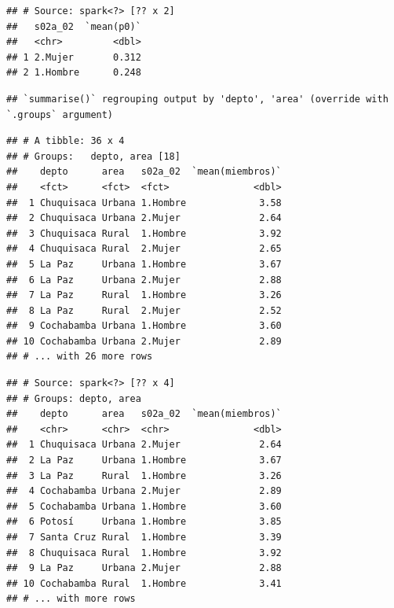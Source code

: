 \documentclass[
]{article}
\newenvironment{Shaded}{\begin{snugshade}}{\end{snugshade}}
\newcommand{\CommentTok}[1]{\textcolor[rgb]{0.56,0.35,0.01}{\textit{#1}}}
\newcommand{\DecValTok}[1]{\textcolor[rgb]{0.00,0.00,0.81}{#1}}
\newcommand{\KeywordTok}[1]{\textcolor[rgb]{0.13,0.29,0.53}{\textbf{#1}}}
\newcommand{\NormalTok}[1]{#1}
\newcommand{\OperatorTok}[1]{\textcolor[rgb]{0.81,0.36,0.00}{\textbf{#1}}}
\newcommand{\StringTok}[1]{\textcolor[rgb]{0.31,0.60,0.02}{#1}}
\begin{document}
\begin{verbatim}
## # Source: spark<?> [?? x 2]
##   s02a_02  `mean(p0)`
##   <chr>         <dbl>
## 1 2.Mujer       0.312
## 2 1.Hombre      0.248
\end{verbatim}

\begin{Shaded}
\end{Shaded}

\begin{verbatim}
## `summarise()` regrouping output by 'depto', 'area' (override with `.groups` argument)
\end{verbatim}

\begin{verbatim}
## # A tibble: 36 x 4
## # Groups:   depto, area [18]
##    depto      area   s02a_02  `mean(miembros)`
##    <fct>      <fct>  <fct>               <dbl>
##  1 Chuquisaca Urbana 1.Hombre             3.58
##  2 Chuquisaca Urbana 2.Mujer              2.64
##  3 Chuquisaca Rural  1.Hombre             3.92
##  4 Chuquisaca Rural  2.Mujer              2.65
##  5 La Paz     Urbana 1.Hombre             3.67
##  6 La Paz     Urbana 2.Mujer              2.88
##  7 La Paz     Rural  1.Hombre             3.26
##  8 La Paz     Rural  2.Mujer              2.52
##  9 Cochabamba Urbana 1.Hombre             3.60
## 10 Cochabamba Urbana 2.Mujer              2.89
## # ... with 26 more rows
\end{verbatim}

\begin{Shaded}
\end{Shaded}

\begin{verbatim}
## # Source: spark<?> [?? x 4]
## # Groups: depto, area
##    depto      area   s02a_02  `mean(miembros)`
##    <chr>      <chr>  <chr>               <dbl>
##  1 Chuquisaca Urbana 2.Mujer              2.64
##  2 La Paz     Urbana 1.Hombre             3.67
##  3 La Paz     Rural  1.Hombre             3.26
##  4 Cochabamba Urbana 2.Mujer              2.89
##  5 Cochabamba Urbana 1.Hombre             3.60
##  6 Potosí     Urbana 1.Hombre             3.85
##  7 Santa Cruz Rural  1.Hombre             3.39
##  8 Chuquisaca Rural  1.Hombre             3.92
##  9 La Paz     Urbana 2.Mujer              2.88
## 10 Cochabamba Rural  1.Hombre             3.41
## # ... with more rows
\end{verbatim}
\end{document}
